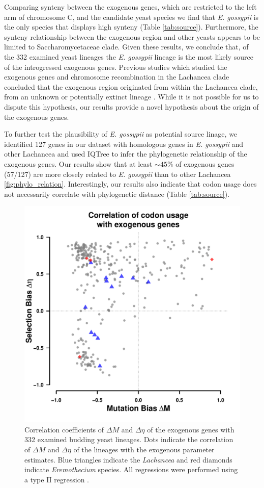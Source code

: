 \documentclass[doublespacing,linenumbers]{bmcart-modified}
\newcommand{\gossypii}{\textit{E. gossypii}\xspace}
\newcommand{\DM}{\ensuremath{{\Delta M}}\xspace}
\newcommand{\DE}{\ensuremath{{\Delta \eta}}\xspace}
\begin{document}
Comparing synteny between the exogenous genes, which are restricted to the left arm of chromosome C, and the candidate yeast species we find that \gossypii is the only species that displays high synteny (Table \ref{tab:source}).
Furthermore, the synteny relationship between the exogenous region and other yeasts appears to be limited to Saccharomycetaceae clade.
Given these results, we conclude that, of the 332 examined yeast lineages the \gossypii lineage is the most likely source of the introgressed exogenous genes.
Previous studies which studied the exogenous genes and chromosome recombination in the Lachancea clade concluded that the exogenous region originated from within the Lachancea clade, from an unknown or potentially extinct lineage \citep{payen2009, friedrich2015, vakirlis2016}.
While it is not possible for us to dispute this hypothesis, our results provide a novel hypothesis about the origin of the exogenous genes.

To further test the plausibility of \gossypii as potential source linage, we identified 127 genes in our dataset \citep{shen2018} with homologous genes in \gossypii and other Lachancea and used IQTree \citep{nguyen2015} to infer the phylogenetic relationship of the exogenous genes. 
Our results show that at least $\sim 45 \%$ of exogenous genes (57/127) are more closely related to \gossypii than to other Lachancea \ref{fig:phylo_relation}.
Interestingly, our results also indicate that codon usage does not necessarily correlate with phylogenetic distance (Table \ref{tab:source}). 

\begin{figure}
     \centering
	\includegraphics[width=.45\textwidth]{img/fig4.pdf}%
	\caption{Correlation coefficients of \DM and \DE of the exogenous genes with 332 examined budding yeast lineages. 
	Dots indicate the correlation of \DM and \DE of the lineages with the exogenous parameter estimates.
	Blue triangles indicate the \textit{Lachancea} and red diamonds indicate \textit{Eremothecium} species.
	All regressions were performed using a type II regression \citep{SokalAndRohlf1981}.}
	\label{fig:csp_exo_comp}
\end{figure}
\end{document}
